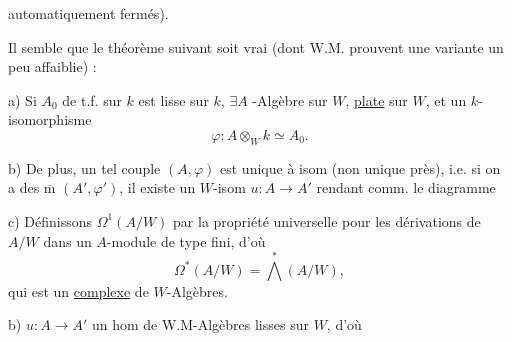 
automatiquement fermés). 

Il semble que le théorème suivant soit vrai (dont W.M. prouvent une variante un peu affaiblie) :

a) Si $A_0$ de t.f. sur $k$ est lisse sur $k$, $\exists A$ -Algèbre sur $W$, \uline{plate} sur $W$, et un $k$-isomorphisme
\[
\varphi:A\otimes_W k\simeq A_0.
\]

b) De plus, un tel couple $(A,\varphi)$ est unique à isom (non unique près), i.e. si on a des  $\overline{\mathrm m}$ $(A',\varphi')$, il existe un $W$-isom $u:A\longrightarrow A'$ rendant comm. le diagramme


c) Définissons  $\Omega^1(A/W)$ par la propriété universelle pour les dérivations de $A/W$ dans un $A$-module de type fini, d'où
\[
\Omega^*(A/W)=\bigwedge^*(A/W),
\]
qui est un \uline{complexe} de $W$-Algèbres.





b) $u:A\longrightarrow A'$ un hom de W.M-Algèbres lisses sur $W$, d'où

